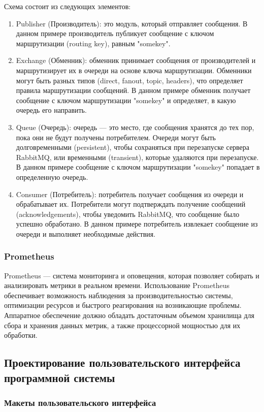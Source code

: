 Схема состоит из следующих элементов:
\begin{enumerate}
	\item Publisher (Производитель): это модуль, который отправляет сообщения. В данном примере производитель публикует сообщение с ключом маршрутизации (routing key), равным "somekey".	
	\item Exchange (Обменник): обменник принимает сообщения от производителей и маршрутизирует их в очереди на основе ключа маршрутизации. Обменники могут быть разных типов (direct, fanout, topic, headers), что определяет правила маршрутизации сообщений. В данном примере обменник получает сообщение с ключом маршрутизации "somekey" и определяет, в какую очередь его направить.
	\item Queue (Очередь): очередь — это место, где сообщения хранятся до тех пор, пока они не будут получены потребителем. Очереди могут быть долговременными (persistent), чтобы сохраняться при перезапуске сервера RabbitMQ, или временными (transient), которые удаляются при перезапуске. В данном примере сообщение с ключом маршрутизации "somekey" попадает в определенную очередь.
	\item Consumer (Потребитель): потребитель получает сообщения из очереди и обрабатывает их. Потребители могут подтверждать получение сообщений (acknowledgements), чтобы уведомить RabbitMQ, что сообщение было успешно обработано. В данном примере потребитель извлекает сообщение из очереди и выполняет необходимые действия.
\end{enumerate}

\subsubsection{Prometheus}

Prometheus — система мониторинга и оповещения, которая позволяет собирать и анализировать метрики в реальном времени. Использование Prometheus обеспечивает возможность наблюдения за производительностью системы, оптимизации ресурсов и быстрого реагирования на возникающие проблемы. Аппаратное обеспечение должно обладать достаточным объемом хранилища для сбора и хранения данных метрик, а также процессорной мощностью для их обработки.

\subsection{Проектирование пользовательского интерфейса программной системы}
\subsubsection{Макеты пользовательского интерфейса}

